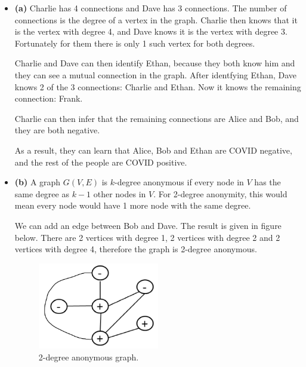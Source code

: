 \documentclass[12pt,reqno]{amsart}
\begin{document}
\begin{itemize}[label=]
	\item \textbf{(a)} Charlie has 4 connections and Dave has 3 connections. The number of connections is the degree of a vertex in the graph. Charlie then knows that it is the vertex with degree 4, and Dave knows it is the vertex with degree 3. Fortunately for them there is only 1 such vertex for both degrees.
	
	Charlie and Dave can then identify Ethan, because they both know him and they can see a mutual connection in the graph. After identfying Ethan, Dave knows 2 of the 3 connections: Charlie and Ethan. Now it knows the remaining connection: Frank.
	
	Charlie can then infer that the remaining connections are Alice and Bob, and they are both negative.
	
	As a result, they can learn that Alice, Bob and Ethan are COVID negative, and the rest of the people are COVID positive.
	\item \textbf{(b)} A graph $G(V,E)$ is $k$-degree anonymous if every node in $V$ has the same degree as $k-1$ other nodes in $V$. For 2-degree anonymity, this would mean every node would have 1 more node with the same degree.
	
	We can add an edge between Bob and Dave. The result is given in figure below. There are 2 vertices with degree 1, 2 vertices with degree 2 and 2 vertices with degree 4, therefore the graph is 2-degree anonymous.
	\begin{figure}[hb]
		\caption{2-degree anonymous graph.}
		\includegraphics[width=0.5\textwidth]{img/q6.png}
	\end{figure}
	
	
\end{itemize}
\end{document}
